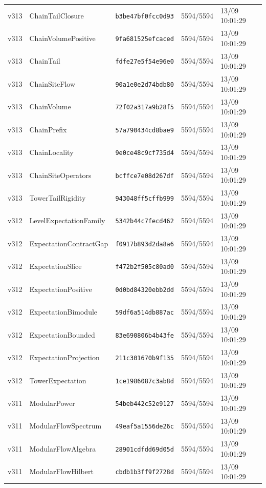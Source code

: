 \documentclass[11pt]{article}
\theoremstyle{definition}\newtheorem{deriv}{Derivação}
\begin{document}
{\begin{longtable}{@{}lllll@{}}
v313 & ChainTailClosure & \texttt{b3be47bf0fcc0d93} & 5594/5594 & 13/09 10:01:29 \\
v313 & ChainVolumePositive & \texttt{9fa681525efcaced} & 5594/5594 & 13/09 10:01:29 \\
v313 & ChainTail & \texttt{fdfe27e5f54e96e0} & 5594/5594 & 13/09 10:01:29 \\
v313 & ChainSiteFlow & \texttt{90a1e0e2d74bdb80} & 5594/5594 & 13/09 10:01:29 \\
v313 & ChainVolume & \texttt{72f02a317a9b28f5} & 5594/5594 & 13/09 10:01:29 \\
v313 & ChainPrefix & \texttt{57a790434cd8bae9} & 5594/5594 & 13/09 10:01:29 \\
v313 & ChainLocality & \texttt{9e0ce48c9cf735d4} & 5594/5594 & 13/09 10:01:29 \\
v313 & ChainSiteOperators & \texttt{bcffce7e08d267df} & 5594/5594 & 13/09 10:01:29 \\
v313 & TowerTailRigidity & \texttt{943048ff5cffb999} & 5594/5594 & 13/09 10:01:29 \\
v312 & LevelExpectationFamily & \texttt{5342b44c7fecd462} & 5594/5594 & 13/09 10:01:29 \\
v312 & ExpectationContractGap & \texttt{f0917b893d2da8a6} & 5594/5594 & 13/09 10:01:29 \\
v312 & ExpectationSlice & \texttt{f472b2f505c80ad0} & 5594/5594 & 13/09 10:01:29 \\
v312 & ExpectationPositive & \texttt{0d0bd84320ebb2dd} & 5594/5594 & 13/09 10:01:29 \\
v312 & ExpectationBimodule & \texttt{59df6a514db887ac} & 5594/5594 & 13/09 10:01:29 \\
v312 & ExpectationBounded & \texttt{83e690806b4b43fe} & 5594/5594 & 13/09 10:01:29 \\
v312 & ExpectationProjection & \texttt{211c301670b9f135} & 5594/5594 & 13/09 10:01:29 \\
v312 & TowerExpectation & \texttt{1ce1986087c3ab8d} & 5594/5594 & 13/09 10:01:29 \\
v311 & ModularPower & \texttt{54beb442c52e9127} & 5594/5594 & 13/09 10:01:29 \\
v311 & ModularFlowSpectrum & \texttt{49eaf5a1556de26c} & 5594/5594 & 13/09 10:01:29 \\
v311 & ModularFlowAlgebra & \texttt{28901cdfdd69d05d} & 5594/5594 & 13/09 10:01:29 \\
v311 & ModularFlowHilbert & \texttt{cbdb1b3ff9f2728d} & 5594/5594 & 13/09 10:01:29 \\

\end{longtable}}
\end{document}
